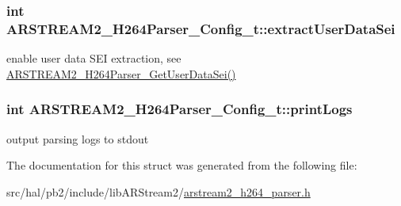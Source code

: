 \subsubsection[{\texorpdfstring{extract\+User\+Data\+Sei}{extractUserDataSei}}]{\setlength{\rightskip}{0pt plus 5cm}int A\+R\+S\+T\+R\+E\+A\+M2\+\_\+\+H264\+Parser\+\_\+\+Config\+\_\+t\+::extract\+User\+Data\+Sei}\hypertarget{struct_a_r_s_t_r_e_a_m2___h264_parser___config__t_ada303e0c798ed6f0ae46d37e60222be8}{}\label{struct_a_r_s_t_r_e_a_m2___h264_parser___config__t_ada303e0c798ed6f0ae46d37e60222be8}
enable user data S\+EI extraction, see \hyperlink{arstream2__h264__parser_8h_ae0da74913dd04cf2f341300e67ece0cd}{A\+R\+S\+T\+R\+E\+A\+M2\+\_\+\+H264\+Parser\+\_\+\+Get\+User\+Data\+Sei()} 
\subsubsection[{\texorpdfstring{print\+Logs}{printLogs}}]{\setlength{\rightskip}{0pt plus 5cm}int A\+R\+S\+T\+R\+E\+A\+M2\+\_\+\+H264\+Parser\+\_\+\+Config\+\_\+t\+::print\+Logs}\hypertarget{struct_a_r_s_t_r_e_a_m2___h264_parser___config__t_a67c3eb3b1b0be799b57546c080b000d9}{}\label{struct_a_r_s_t_r_e_a_m2___h264_parser___config__t_a67c3eb3b1b0be799b57546c080b000d9}
output parsing logs to stdout 

The documentation for this struct was generated from the following file\+:\begin{DoxyCompactItemize}
\item 
src/hal/pb2/include/lib\+A\+R\+Stream2/\hyperlink{arstream2__h264__parser_8h}{arstream2\+\_\+h264\+\_\+parser.\+h}\end{DoxyCompactItemize}
